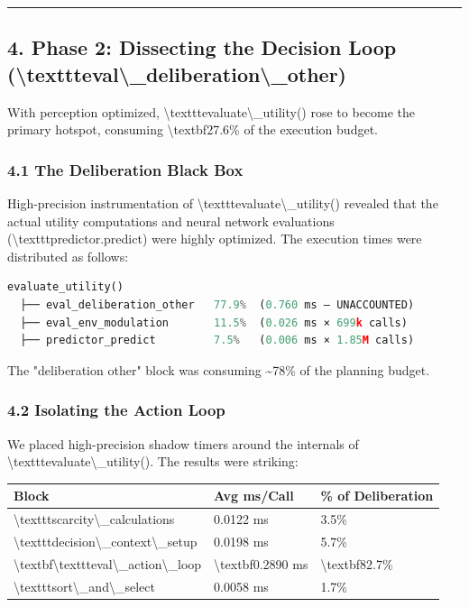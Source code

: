 \documentclass[11pt,a4paper]{article}
\begin{document}
\noindent\rule{\textwidth}{0.4pt}

\subsection*{4. Phase 2: Dissecting the Decision Loop (\textbackslash{}texttt{eval\textbackslash{}\_deliberation\textbackslash{}\_other})}

With perception optimized, \textbackslash{}texttt{evaluate\textbackslash{}\_utility()} rose to become the primary hotspot, consuming \textbackslash{}textbf{27.6\%} of the execution budget.

\subsubsection*{4.1 The Deliberation Black Box}
High-precision instrumentation of \textbackslash{}texttt{evaluate\textbackslash{}\_utility()} revealed that the actual utility computations and neural network evaluations (\textbackslash{}texttt{predictor.predict}) were highly optimized. The execution times were distributed as follows:

\begin{lstlisting}[language=Python]
evaluate_utility()
  ├── eval_deliberation_other   77.9%  (0.760 ms — UNACCOUNTED)
  ├── eval_env_modulation       11.5%  (0.026 ms × 699k calls)
  ├── predictor_predict         7.5%   (0.006 ms × 1.85M calls)
\end{lstlisting}

The "deliberation other" block was consuming \textasciitilde{}78\% of the planning budget.

\subsubsection*{4.2 Isolating the Action Loop}
We placed high-precision shadow timers around the internals of \textbackslash{}texttt{evaluate\textbackslash{}\_utility()}. The results were striking:

\begin{longtable}{lll}
\toprule
Block & Avg ms/Call & \% of Deliberation \\
\midrule
\endhead
\textbackslash{}texttt{scarcity\textbackslash{}\_calculations} & 0.0122 ms & 3.5\% \\
\textbackslash{}texttt{decision\textbackslash{}\_context\textbackslash{}\_setup} & 0.0198 ms & 5.7\% \\
\textbackslash{}textbf{\textbackslash{}texttt{eval\textbackslash{}\_action\textbackslash{}\_loop}} & \textbackslash{}textbf{0.2890 ms} & \textbackslash{}textbf{82.7\%} \\
\textbackslash{}texttt{sort\textbackslash{}\_and\textbackslash{}\_select} & 0.0058 ms & 1.7\% \\
\bottomrule
\end{longtable}
\end{document}
